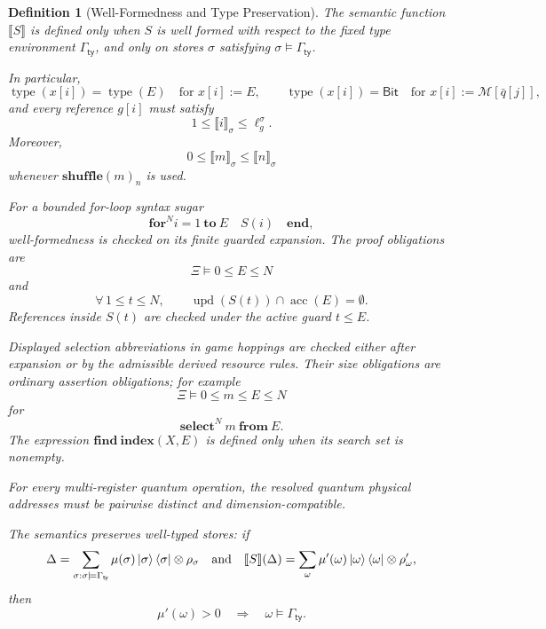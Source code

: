 \documentclass[acmsmall,screen,review,anonymous,nonacm]{acmart}
\newtheorem{definition}{Definition}[section]
\theoremstyle{defn_style}
\begin{document}
\begin{definition}[Well-Formedness and Type Preservation]
The semantic function \(\llbracket S\rrbracket\) is defined only when
\(S\) is well formed with respect to the fixed type environment
\(\Gamma_{\mathsf{ty}}\), and only on stores \(\sigma\) satisfying
\(\sigma\models\Gamma_{\mathsf{ty}}\).

In particular,
\[
\operatorname{type}(x[i])=\operatorname{type}(E)
\quad\text{for }x[i]:=E,
\qquad
\operatorname{type}(x[i])=\mathsf{Bit}
\quad\text{for }x[i]:=\mathcal M[\bar q[j]],
\]
and every reference \(g[i]\) must satisfy
\[
1\le \llbracket i\rrbracket_\sigma\le \ell_g^\sigma.
\]
Moreover,
\[
0\le \llbracket m\rrbracket_\sigma\le \llbracket n\rrbracket_\sigma
\]
whenever \(\mathbf{shuffle}(m)_n\) is used.

For a bounded for-loop syntax sugar
\[
\mathbf{for}^{N}i=1\mathbf{~to~}E\quad S(i)\quad\mathbf{end},
\]
well-formedness is checked on its finite guarded expansion. The proof
obligations are
\[
\Xi\vDash 0\le E\le N
\]
and
\[
\forall\,1\le t\le N,\qquad
\operatorname{upd}(S(t))\cap\operatorname{acc}(E)=\emptyset.
\]
References inside \(S(t)\) are checked under the active guard \(t\le E\).

Displayed selection abbreviations in game hoppings are checked either after
expansion or by the admissible derived resource rules. Their size obligations
are ordinary assertion obligations; for example
\[
\Xi\vDash 0\le m\le E\le N
\]
for
\[
\mathbf{select}^{N}\ m\ \mathbf{from}\ E.
\]
The expression \(\mathbf{find~index}(X,E)\) is defined only when its search set
is nonempty.

For every multi-register quantum operation, the resolved quantum physical
addresses must be pairwise distinct and dimension-compatible.

The semantics preserves well-typed stores: if
\[
\Delta
=
\sum_{\sigma:\sigma\models\Gamma_{\mathsf{ty}}}
\mu(\sigma)\ket{\sigma}\bra{\sigma}\otimes\rho_\sigma
\quad\text{and}\quad
\llbracket S\rrbracket(\Delta)
=
\sum_{\omega}\mu'(\omega)\ket{\omega}\bra{\omega}\otimes\rho'_\omega,
\]
then
\[
\mu'(\omega)>0
\quad\Longrightarrow\quad
\omega\models\Gamma_{\mathsf{ty}}.
\]
\end{definition}
\end{document}
